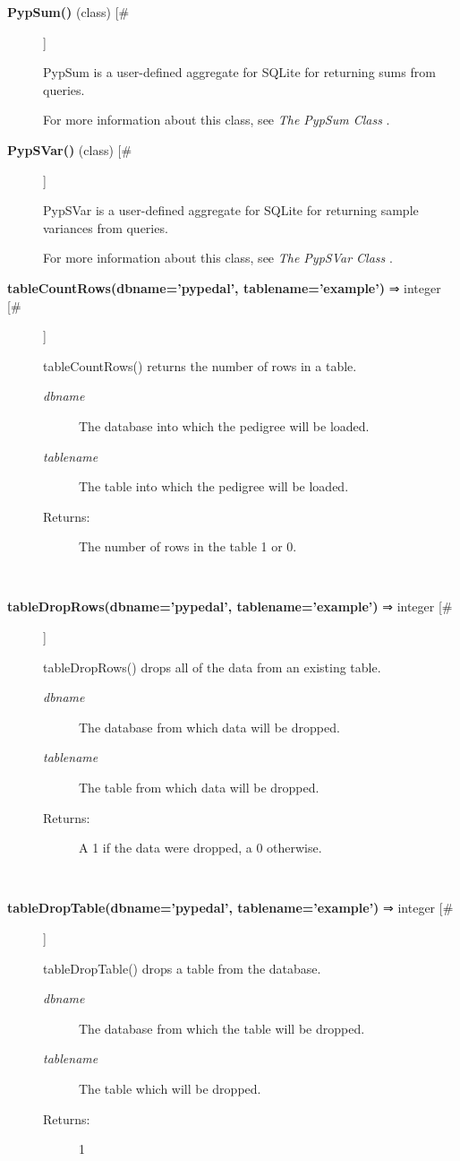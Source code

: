 \begin{description}
\item[\textbf{PypSum()}
 (class) [\#]]

 PypSum is a user-defined aggregate for SQLite for returning sums from queries.


 For more information about this class, see \emph{The PypSum Class}
.

\item[\textbf{PypSVar()}
 (class) [\#]]

 PypSVar is a user-defined aggregate for SQLite for returning sample variances from queries.


 For more information about this class, see \emph{The PypSVar Class}
.

\item[\textbf{tableCountRows(dbname='pypedal', tablename='example')}
 ⇒ integer [\#]]

 tableCountRows() returns the number of rows in a table.
\begin{description}
\item[\emph{dbname}
] The database into which the pedigree will be loaded.
\item[\emph{tablename}
] The table into which the pedigree will be loaded.
\item[Returns:] The number of rows in the table 1 or 0.

\end{description}
\\ 

\item[\textbf{tableDropRows(dbname='pypedal', tablename='example')}
 ⇒ integer [\#]]

 tableDropRows() drops all of the data from an existing table.
\begin{description}
\item[\emph{dbname}
] The database from which data will be dropped.
\item[\emph{tablename}
] The table from which data will be dropped.
\item[Returns:] A 1 if the data were dropped, a 0 otherwise.

\end{description}
\\ 

\item[\textbf{tableDropTable(dbname='pypedal', tablename='example')}
 ⇒ integer [\#]]

 tableDropTable() drops a table from the database.
\begin{description}
\item[\emph{dbname}
] The database from which the table will be dropped.
\item[\emph{tablename}
] The table which will be dropped.
\item[Returns:] 1


\end{description}
\end{description}
